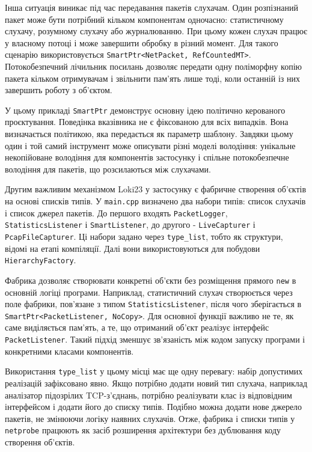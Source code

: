 Інша ситуація виникає під час передавання пакетів слухачам. Один
розпізнаний пакет може бути потрібний кільком компонентам одночасно:
статистичному слухачу, розумному слухачу або журналюванню. При цьому
кожен слухач працює у власному потоці і може завершити обробку в різний
момент. Для такого сценарію використовується
\texttt{SmartPtr\textless{}NetPacket,\ RefCountedMT\textgreater{}}.
Потокобезпечний лічильник посилань дозволяє передати одну поліморфну
копію пакета кільком отримувачам і звільнити пам'ять лише тоді, коли
останній із них завершить роботу з об'єктом.

У цьому прикладі \texttt{SmartPtr} демонструє основну ідею політично
керованого проєктування. Поведінка вказівника не є фіксованою для всіх
випадків. Вона визначається політикою, яка передається як параметр
шаблону. Завдяки цьому один і той самий інструмент може описувати різні
моделі володіння: унікальне некопійоване володіння для компонентів
застосунку і спільне потокобезпечне володіння для пакетів, що
розсилаються між слухачами.

Другим важливим механізмом Loki23 у застосунку є фабричне створення
об'єктів на основі списків типів. У \texttt{main.cpp} визначено два
набори типів: список слухачів і список джерел пакетів. До першого
входять \texttt{PacketLogger}, \texttt{StatisticsListener} і
\texttt{SmartListener}, до другого - \texttt{LiveCapturer} і
\texttt{PcapFileCapturer}. Ці набори задано через \texttt{type\_list},
тобто як структури, відомі на етапі компіляції. Далі вони
використовуються для побудови \texttt{HierarchyFactory}.

Фабрика дозволяє створювати конкретні об'єкти без розміщення прямого
\texttt{new} в основній логіці програми. Наприклад, статистичний слухач
створюється через поле фабрики, пов'язане з типом
\texttt{StatisticsListener}, після чого зберігається в
\texttt{SmartPtr\textless{}PacketListener,\ NoCopy\textgreater{}}. Для
основної функції важливо не те, як саме виділяється пам'ять, а те, що
отриманий об'єкт реалізує інтерфейс \texttt{PacketListener}. Такий
підхід зменшує зв'язаність між кодом запуску програми і конкретними
класами компонентів.

Використання \texttt{type\_list} у цьому місці має ще одну перевагу:
набір допустимих реалізацій зафіксовано явно. Якщо потрібно додати новий
тип слухача, наприклад аналізатор підозрілих TCP-з'єднань, потрібно
реалізувати клас із відповідним інтерфейсом і додати його до списку
типів. Подібно можна додати нове джерело пакетів, не змінюючи логіку
наявних слухачів. Отже, фабрика і списки типів у \texttt{netprobe}
працюють як засіб розширення архітектури без дублювання коду створення
об'єктів.

